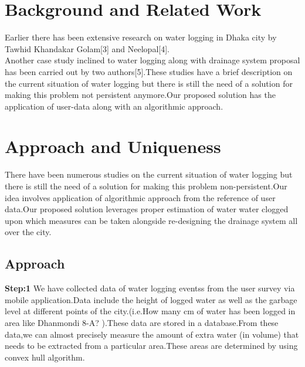 \documentclass{acm_proc_article-sp}
\begin{document}
\section{Background and Related Work}

Earlier there has been extensive research on water logging in Dhaka city by Tawhid Khandakar Golam[3] and Neelopal[4].\\Another case study inclined to water logging along with drainage system proposal has been carried out by two authors[5].These studies have a brief description on the current situation of water logging but there is still the need of a solution for making this problem not persistent anymore.Our proposed solution has the application of user-data along with an algorithmic approach.

\section{Approach and Uniqueness}

There have been numerous studies on the current situation of water logging but there is still the need of a solution for making this problem non-persistent.Our idea involves application of algorithmic approach from the reference of user data.Our proposed solution leverages proper estimation of water water clogged upon which measures can be taken alongside re-designing the drainage system all over the city.

\subsection{Approach}

\textbf{Step:1} We have collected data of water logging eventss from the user survey via mobile application.Data include the height of logged water as well as the garbage level at different points of the city.(i.e.How many cm of water has been logged in area like Dhanmondi 8-A? ).These data are stored in a database.From these data,we can almost precisely measure the amount of extra water (in volume) that needs to be extracted from a particular area.These areas are determined by using convex hull algorithm.
\end{document}
